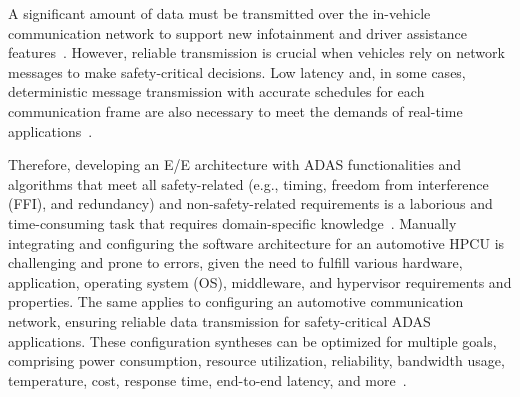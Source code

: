     A significant amount of data must be transmitted over the in-vehicle communication network to support new infotainment and driver assistance features~\cite{askaripoor2023designer}. However, reliable transmission is crucial when vehicles rely on network messages to make safety-critical decisions. Low latency and, in some cases, deterministic message transmission with accurate schedules for each communication frame are also necessary to meet the demands of real-time applications~\cite{9212001,askaripoor2023designer}.

    Therefore, developing an E/E architecture with ADAS functionalities and algorithms that meet all safety-related (e.g., timing, freedom from interference (FFI), and redundancy) and non-safety-related requirements is a laborious and time-consuming task that requires domain-specific knowledge~\cite{9565115,9212001}. Manually integrating and configuring the software architecture for an automotive HPCU is challenging and prone to errors, given the need to fulfill various hardware, application, operating system (OS), middleware, and hypervisor requirements and properties. The same applies to configuring an automotive communication network, ensuring reliable data transmission for safety-critical ADAS applications. These configuration syntheses can be optimized for multiple goals, comprising power consumption, resource utilization, reliability, bandwidth usage, temperature, cost, response time, end-to-end latency, and more~\cite{askaripoor2022architecture,9212001,askaripoor2023designer}. 
    
